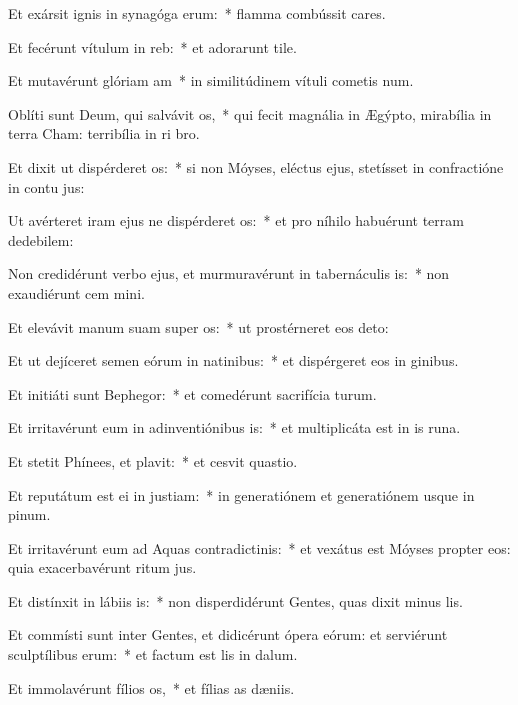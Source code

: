 \item Et exársit ignis in synagóga erum:~* flamma combússit cares.
\item Et fecérunt vítulum in reb:~* et adorarunt tile.
\item Et mutavérunt glóriam am~* in similitúdinem vítuli cometis num.
\item Oblíti sunt Deum, qui salvávit os,~* qui fecit magnália in Ægýpto, mirabília in terra Cham: terribília in ri bro.
\item Et dixit ut dispérderet os:~* si non Móyses, eléctus ejus, stetísset in confractióne in contu jus:
\item Ut avérteret iram ejus ne dispérderet os:~* et pro níhilo habuérunt terram dedebilem:
\item Non credidérunt verbo ejus, et murmuravérunt in tabernáculis is:~* non exaudiérunt cem mini.
\item Et elevávit manum suam super os:~* ut prostérneret eos  deto:
\item Et ut dejíceret semen eórum in natinibus:~* et dispérgeret eos in ginibus.
\item Et initiáti sunt Bephegor:~* et comedérunt sacrifícia turum.
\item Et irritavérunt eum in adinventiónibus is:~* et multiplicáta est in is runa.
\item Et stetit Phínees, et plavit:~* et cesvit quastio.
\item Et reputátum est ei in justiam:~* in generatiónem et generatiónem usque in pinum.
\item Et irritavérunt eum ad Aquas contradictinis:~* et vexátus est Móyses propter eos: quia exacerbavérunt ritum jus.
\item Et distínxit in lábiis is:~* non disperdidérunt Gentes, quas dixit minus lis.
\item Et commísti sunt inter Gentes, et didicérunt ópera eórum: et serviérunt sculptílibus erum:~* et factum est lis in dalum.
\item Et immolavérunt fílios os,~* et fílias as dæniis.
